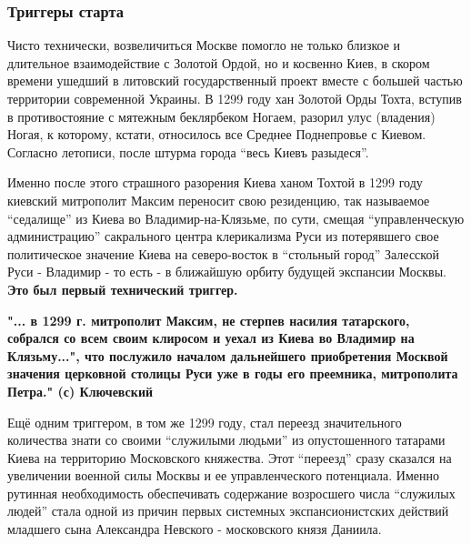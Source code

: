  
 
 
 
 

\subsubsection{Триггеры старта}

Чисто технически, возвеличиться Москве помогло не только близкое и длительное
взаимодействие с Золотой Ордой, но и косвенно Киев, в скором времени ушедший в
литовский государственный проект вместе с большей частью территории современной
Украины. В 1299 году хан Золотой Орды Тохта, вступив в противостояние с
мятежным беклярбеком Ногаем, разорил улус (владения) Ногая, к которому, кстати,
относилось все Среднее Поднепровье с Киевом. Согласно летописи, после штурма
города \enquote{весь Киевъ разыдеся}.

Именно после этого страшного разорения Киева ханом Тохтой в 1299 году киевский
митрополит Максим переносит свою резиденцию, так называемое \enquote{седалище}
из Киева во Владимир-на-Клязьме, по сути, смещая \enquote{управленческую
администрацию} сакрального центра клерикализма Руси из потерявшего свое
политическое значение Киева на северо-восток в \enquote{стольный город}
Залесской Руси - Владимир - то есть - в ближайшую орбиту будущей экспансии
Москвы. \textbf{Это был первый технический триггер.}

\textbf{"... в 1299 г. митрополит Максим, не стерпев насилия татарского, собрался со всем
своим клиросом и уехал из Киева во Владимир на Клязьму...", что послужило началом
дальнейшего приобретения Москвой значения церковной столицы Руси уже в годы его
преемника, митрополита Петра." (с) Ключевский}

Ещё одним триггером, в том же 1299 году, стал переезд значительного количества
знати со своими \enquote{служилыми людьми} из опустошенного татарами Киева на
территорию Московского княжества. Этот \enquote{переезд} сразу сказался на увеличении
военной силы Москвы и ее управленческого потенциала. Именно рутинная
необходимость обеспечивать содержание возросшего числа \enquote{служилых людей} стала
одной из причин первых системных экспансионистских действий младшего сына
Александра Невского - московского князя Даниила.
